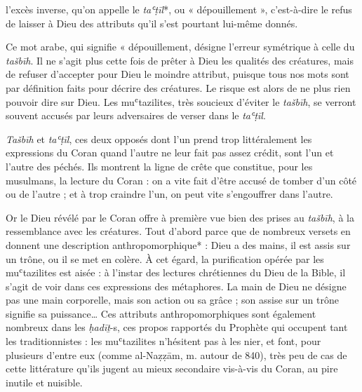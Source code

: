 l'excès inverse, qu'on appelle le \emph{taʿṭīl}*, ou « dépouillement »,
c'est-à-dire le refus de laisser à Dieu des attributs qu'il s'est
pourtant lui-même donnés.
\begin{Def}[Taʿṭīl ]
Ce mot arabe, qui signifie « dépouillement,
désigne l'erreur symétrique à celle du \emph{tašbīh}. Il ne s'agit plus
cette fois de prêter à Dieu les qualités des créatures, mais de refuser
d'accepter pour Dieu le moindre attribut, puisque tous nos mots sont par
définition faits pour décrire des créatures. Le risque est alors de ne
plus rien pouvoir dire sur Dieu. Les muʿtazilites, très soucieux
d'éviter le \emph{tašbīh}, se verront souvent accusés par leurs
adversaires de verser dans le \emph{taʿṭīl}.
\end{Def}


\emph{Tašbīh} et \emph{taʿṭīl}, ces deux
opposés dont l'un prend trop littéralement les expressions du Coran
quand l'autre ne leur fait pas assez crédit, sont l'un et l'autre des
péchés. Ils montrent la ligne de crête que constitue, pour les
musulmans, la lecture du Coran : on a vite fait d'être accusé de tomber
d'un côté ou de l'autre ; et à trop craindre l'un, on peut vite
s'engouffrer dans l'autre.

Or le Dieu révélé par le Coran offre à première vue bien des prises au
\emph{tašbīh}, à la ressemblance avec les créatures. Tout d'abord parce
que de nombreux versets en donnent une description anthropomorphique* :
Dieu a des mains, il est assis sur un trône, ou il se met en colère. À
cet égard, la purification opérée par les muʿtazilites est aisée : à
l'instar des lectures chrétiennes du Dieu de la Bible, il s'agit de voir
dans ces expressions des métaphores. La main de Dieu ne désigne pas une
main corporelle, mais son action ou sa grâce ; son assise sur un trône
signifie sa puissance\ldots{} Ces attributs anthropomorphiques sont
également nombreux dans les \emph{ḥadīṯ}-s, ces propos rapportés du
Prophète qui occupent tant les traditionnistes : les muʿtazilites
n'hésitent pas à les nier, et font, pour plusieurs d'entre eux (comme
al-Naẓẓām, m. autour de 840), très peu de cas de cette littérature
qu'ils jugent au mieux secondaire vis-à-vis du Coran, au pire inutile et
nuisible.

